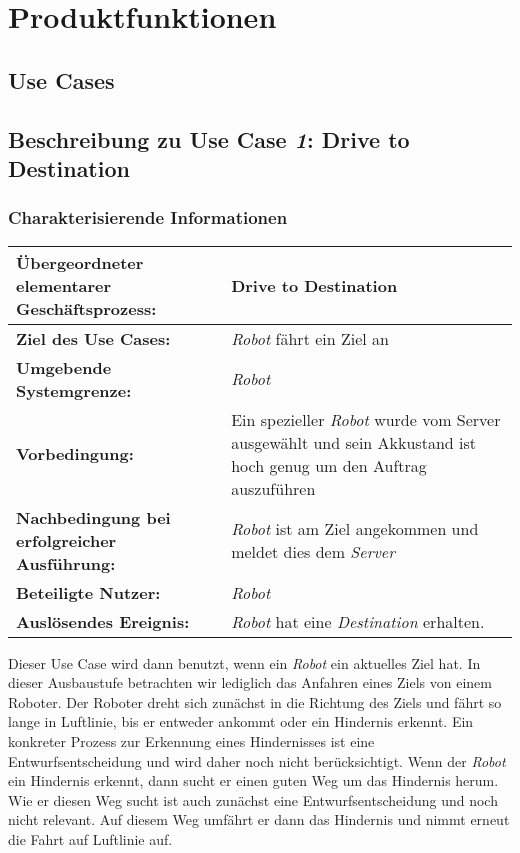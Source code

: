 \documentclass[includeheaders]{scrartcl}
\begin{document}
	\pagebreak
	
	\section{Produktfunktionen}
	
		\subsection{Use Cases}
		
		\subsection{Beschreibung zu Use Case \emph{1}: Drive to Destination}

			\subsubsection*{Charakterisierende Informationen}

			\begin{table}[H]
				\centering
				\begin{tabularx}{\textwidth}{@{}p{5cm}X@{}}
				\toprule
				\textbf{Übergeordneter elementarer Geschäftsprozess:} & Drive to Destination\\ \midrule
				\textbf{Ziel des Use Cases:} & \emph{Robot} fährt ein Ziel an\\ \midrule
				\textbf{Umgebende Systemgrenze:} & \emph{Robot} \\ \midrule
				\textbf{Vorbedingung:} & Ein spezieller \emph{Robot} wurde vom Server ausgewählt und sein Akkustand ist hoch genug um den Auftrag auszuführen \\ \midrule
				\textbf{Nachbedingung bei erfolgreicher Ausführung:} & \emph{Robot} ist am Ziel angekommen und meldet dies dem \emph{Server} \\ \midrule
				\textbf{Beteiligte Nutzer:} & \emph{Robot} \\ \midrule
				\textbf{Auslösendes Ereignis:} & \emph{Robot} hat eine \emph{Destination} erhalten. \\ 
				\bottomrule
				\end{tabularx}
			\end{table}

			Dieser Use Case wird dann benutzt, wenn ein \emph{Robot} ein aktuelles
			Ziel hat. In dieser Ausbaustufe betrachten wir lediglich das Anfahren
			eines Ziels von einem Roboter. Der Roboter dreht sich zunächst in die
			Richtung des Ziels und fährt so lange in Luftlinie, bis er entweder
			ankommt oder ein Hindernis erkennt. Ein konkreter Prozess zur Erkennung
			eines Hindernisses ist eine Entwurfsentscheidung und wird daher noch
			nicht berücksichtigt. Wenn der \emph{Robot} ein Hindernis erkennt, dann
			sucht er einen guten Weg um das Hindernis herum. Wie er diesen Weg sucht
			ist auch zunächst eine Entwurfsentscheidung und noch nicht relevant. Auf
			diesem Weg umfährt er dann das Hindernis und nimmt erneut die Fahrt auf
			Luftlinie auf.
			
\end{document}
